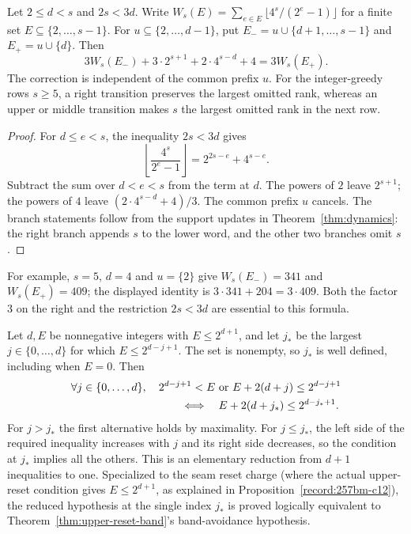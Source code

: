 \begin{lem}
\label{lem:largest-false-rank-algebra}
Let $2\le d<s$ and $2s<3d$.  Write
$W_s(E)=\sum_{e\in E}\lfloor4^s/(2^e-1)\rfloor$ for a finite
set $E\subseteq\{2,\ldots,s-1\}$.  For
$u\subseteq\{2,\ldots,d-1\}$, put
$E_-=u\cup\{d+1,\ldots,s-1\}$ and $E_+=u\cup\{d\}$.
Then
\[
 3W_s(E_-)+3\cdot2^{s+1}+2\cdot4^{s-d}+4=3W_s(E_+).
\]
The correction is independent of the common prefix $u$.
For the integer-greedy rows $s\ge5$, a right transition preserves the
largest omitted rank, whereas an upper or middle transition makes
$s$ the largest omitted rank in the next row.
\end{lem}
\begin{proof}
For $d\le e<s$, the inequality $2s<3d$ gives
\[
 \left\lfloor\frac{4^s}{2^e-1}\right\rfloor
 =2^{2s-e}+4^{s-e}.
\]
Subtract the sum over $d<e<s$ from the term at $d$.  The powers of
$2$ leave $2^{s+1}$; the powers of $4$ leave
$(2\cdot4^{s-d}+4)/3$.  The common prefix $u$ cancels.
The branch statements follow from the support updates in
Theorem~\ref{thm:dynamics}: the right branch appends $s$ to the lower
word, and the other two branches omit $s$.
\end{proof}
For example, $s=5$, $d=4$ and $u=\{2\}$ give
$W_s(E_-)=341$ and $W_s(E_+)=409$; the displayed identity is
$3\cdot341+204=3\cdot409$.  Both the factor $3$ on the right and
the restriction $2s<3d$ are essential to this formula.


\begin{thm}
\label{thm:critical-dyadic-band}
Let $d,E$ be nonnegative integers with $E\le2^{d+1}$, and let $j_*$
be the largest $j\in\{0,\ldots,d\}$ for which $E\le2^{d-j+1}$.
The set is nonempty, so $j_*$ is well defined, including when $E=0$.
Then
\[
 \begin{aligned}
 &\forall j\in\{0,\ldots,d\},\quad
  2^{d-j+1}<E\ \text{or}\ E+2(d+j)\le2^{d-j+1}\\
 &\hspace{35mm}\Longleftrightarrow\quad
 E+2(d+j_*)\le2^{d-j_*+1}.
 \end{aligned}
\]
For $j>j_*$ the first alternative holds by maximality.  For $j\le j_*$,
the left side of the required inequality increases with $j$ and its
right side decreases, so the condition at $j_*$ implies all the others.
This is an elementary reduction from $d+1$ inequalities to one. Specialized to the seam reset charge
(where the actual upper-reset condition gives $E\le2^{d+1}$,
as explained in Proposition~\ref{record:257bm-c12}), the
reduced hypothesis at the single index $j_*$ is proved logically equivalent to
Theorem~\ref{thm:upper-reset-band}'s band-avoidance hypothesis.
\end{thm}

